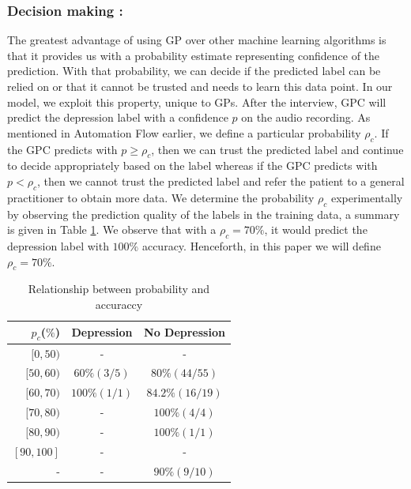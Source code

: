 \documentclass{article}
\begin{document}
	\subsubsection{Decision making :}
The greatest advantage of using GP over other machine learning algorithms is that it provides us with a probability estimate representing confidence of the prediction. 
    With that probability, we can decide if the predicted label can be relied on or that it cannot be trusted and needs to learn this data point. 
    In our model, we exploit this property, unique to GPs. 
    After the interview, GPC will predict the depression label with a confidence $p$ on the audio recording. 
    As mentioned in Automation Flow earlier, we define a particular probability $\rho_c$. 
    If the GPC predicts with $p \geq \rho_c$, then we can trust the predicted label and continue to decide appropriately based on the label whereas if the GPC predicts with $p < \rho_c$, then we cannot trust the predicted label and refer the patient to a general practitioner to obtain more data.
    We determine the probability $\rho_c$ experimentally by observing the prediction quality of the labels in the training data, a summary is given in Table \ref{tab:rho}. We observe that with a $\rho_c = 70\%$, it would predict the depression label with $100\%$ accuracy. 
    Henceforth, in this paper we will define $\rho_c = 70\%$.
	
 	\begin{table}[h]
 		\begin{center}
  			\begin{tabular}{ | r | c | c | }
    			\hline
			 	 \bfseries $p_c$($\%$)	& \bfseries Depression 	& \bfseries No Depression \\ \hline
				 $[0,50)$		& - 				& - 			 			\\ \hline
				 $[50,60)$		& $60\%(3/5)$ 	& $80\%(44/55)$ 	 	\\ \hline 
				 $[60,70)$		& $100\%(1/1)$ & $84.2\%(16/19)$ 	\\ \hline
				 $[70,80)$		& - 				& $100\%(4/4)$		 	\\ \hline
				 $[80,90)$		& - 				& $100\%(1/1)$ 	 	\\ \hline 
				 $[90,100]$		& - 				& - 			 			\\ \hline
				 -					& - 				& $90\%(9/10)$ 		\\ \hline
			 \end{tabular}
		\end{center}
 	\caption{Relationship between probability and accuraccy}
 	\label{tab:rho}
 	\end{table}
\end{document}
